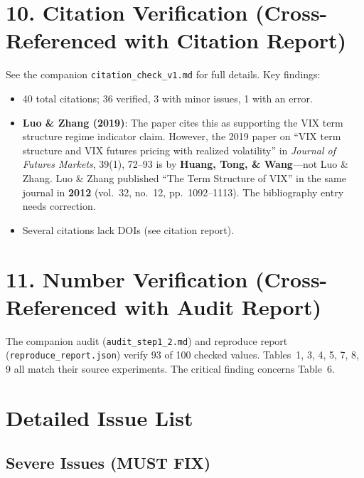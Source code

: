 \documentclass[12pt,a4paper]{article}
\begin{document}
\section*{10. Citation Verification (Cross-Referenced with Citation Report)}

See the companion \texttt{citation\_check\_v1.md} for full details. Key findings:

\begin{itemize}
\item 40 total citations; 36 verified, 3 with minor issues, 1 with an error.
\item \textcolor{errorred}{\textbf{Luo \& Zhang (2019)}}: The paper cites this as supporting the VIX term structure regime indicator claim. However, the 2019 paper on ``VIX term structure and VIX futures pricing with realized volatility'' in \textit{Journal of Futures Markets}, 39(1), 72--93 is by \textbf{Huang, Tong, \& Wang}---not Luo \& Zhang. Luo \& Zhang published ``The Term Structure of VIX'' in the same journal in \textbf{2012} (vol.~32, no.~12, pp.~1092--1113). The bibliography entry needs correction.
\item Several citations lack DOIs (see citation report).
\end{itemize}

\section*{11. Number Verification (Cross-Referenced with Audit Report)}

The companion audit (\texttt{audit\_step1\_2.md}) and reproduce report (\texttt{reproduce\_report.json}) verify 93 of 100 checked values. Tables~1, 3, 4, 5, 7, 8, 9 all match their source experiments. The critical finding concerns Table~6.

\section*{Detailed Issue List}

\subsection*{\textcolor{errorred}{Severe Issues (MUST FIX)}}
\end{document}
